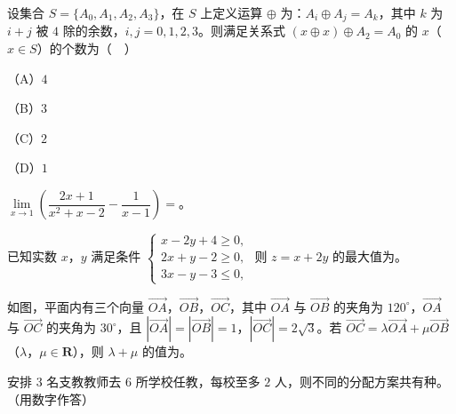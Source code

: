 \begin{question}
设集合 $S=\{A_0,A_1,A_2,A_3\}$，在 $S$ 上定义运算 $\oplus$ 为：$A_i\oplus A_j=A_k$，其中 $k$ 为 $i+j$ 被 $4$ 除的余数，$i,j=0,1,2,3$。则满足关系式 $(x\oplus x)\oplus A_2=A_0$ 的 $x$（$x\in S$）的个数为（　）

（A）$4$

（B）$3$

（C）$2$

（D）$1$

\end{question}

\begin{question}
$\lim\limits_{x\to1}\left(\dfrac{2x+1}{x^2+x-2}-\dfrac1{x-1}\right)=$\gkblank{}。

\end{question}
\begin{question}
已知实数 $x$，$y$ 满足条件 $\begin{cases}x-2y+4\geqslant0,\\ 2x+y-2\geqslant0,\\ 3x-y-3\leqslant0,\end{cases}$ 则 $z=x+2y$ 的最大值为\gkblank{}。

\Needspace{0.4\textheight}
\end{question}
\begin{question}
如图，平面内有三个向量 $\overrightarrow{OA}$，$\overrightarrow{OB}$，$\overrightarrow{OC}$，其中 $\overrightarrow{OA}$ 与 $\overrightarrow{OB}$ 的夹角为 $120^\circ$，$\overrightarrow{OA}$ 与 $\overrightarrow{OC}$ 的夹角为 $30^\circ$，且 $|\overrightarrow{OA}|=|\overrightarrow{OB}|=1$，$|\overrightarrow{OC}|=2\sqrt3$。若 $\overrightarrow{OC}=\lambda\overrightarrow{OA}+\mu\overrightarrow{OB}$（$\lambda$，$\mu\in\mathbf R$），则 $\lambda+\mu$ 的值为\gkblank{}。
\nopagebreak[4]
\begin{center}\end{center}
\nopagebreak[4]
\end{question}
\begin{question}
安排 $3$ 名支教教师去 $6$ 所学校任教，每校至多 $2$ 人，则不同的分配方案共有\gkblank{}种。（用数字作答）

\end{question}


